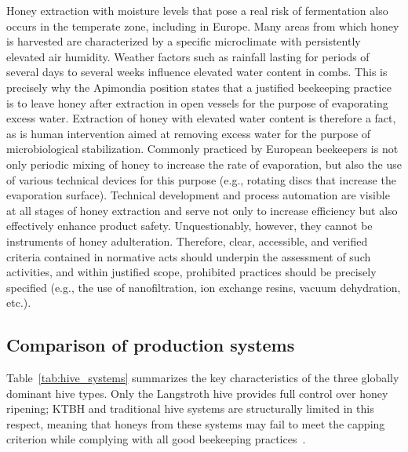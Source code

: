 Honey extraction with moisture levels that pose a real risk of
fermentation also occurs in the temperate zone, including in
Europe. Many areas from which honey is harvested are characterized
by a specific microclimate with persistently elevated air humidity.
Weather factors such as rainfall lasting for periods of several
days to several weeks influence elevated water content in combs.
This is precisely why the Apimondia position states that a justified
beekeeping practice is to leave honey after extraction in open
vessels for the purpose of evaporating excess water. Extraction of
honey with elevated water content is therefore a fact, as is human
intervention aimed at removing excess water for the purpose of
microbiological stabilization. Commonly practiced by European
beekeepers is not only periodic mixing of honey to increase the rate
of evaporation, but also the use of various technical devices for
this purpose (e.g., rotating discs that increase the evaporation
surface). Technical development and process automation are visible
at all stages of honey extraction and serve not only to increase
efficiency but also effectively enhance product safety.
Unquestionably, however, they cannot be instruments of honey
adulteration. Therefore, clear, accessible, and verified criteria
contained in normative acts should underpin the assessment of such
activities, and within justified scope, prohibited practices should
be precisely specified (e.g., the use of nanofiltration, ion exchange
resins, vacuum dehydration, etc.).
\subsection{Comparison of production systems}

Table~\ref{tab:hive_systems} summarizes the key characteristics of
the three globally dominant hive types. Only the Langstroth hive
provides full control over honey ripening; KTBH and traditional
hive systems are structurally limited in this respect, meaning that
honeys from these systems may fail to meet the capping criterion
while complying with all good beekeeping
practices~\cite{tadele2025,sciendo2012,lrrd2013}.

